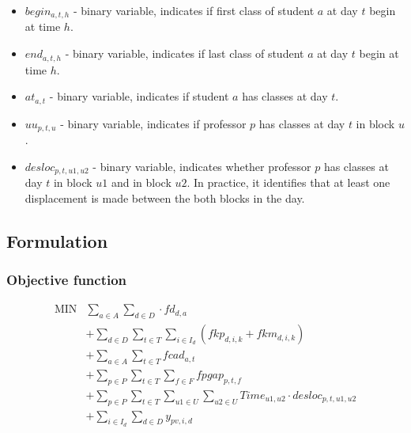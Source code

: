 \begin{itemize}
\item $begin_{a,t,h}$ - binary variable, indicates if first class of student $a$ at day $t$ begin at time $h$.
\item $end_{a,t,h}$ - binary variable, indicates if last class of student $a$ at day $t$ begin at time $h$.
\item $at_{a,t}$ - binary variable, indicates if student $a$ has classes at day $t$.
\item $uu_{p,t,u}$ - binary variable, indicates if professor $p$ has classes at day $t$ in block $u$.
\item $desloc_{p,t,u1,u2}$ - binary variable, indicates whether professor $p$ has classes at day $t$ in block $u1$ and in block $u2$. In practice, it identifies that at least one displacement is made between the both blocks in the day.

\end{itemize}



\subsection{Formulation}


\subsubsection{Objective function}
$$
\begin{array}{rl}
   \mbox{MIN} &
			\sum\limits_{a \in A}\sum\limits_{d \in D} \cdot fd_{d,a}
      \\
      &
       + \sum\limits_{d \in D} \sum\limits_{t \in T} \sum\limits_{i \in I_{d}} (fkp_{d,i,k} + fkm_{d,i,k})
      \\
      &
       + \sum\limits_{a \in A} \sum\limits_{t \in T} fcad_{a,t}
      \\
      &      
      + \sum\limits_{p \in P} \sum\limits_{t \in T} \sum\limits_{f \in F} fpgap_{p,t,f}
			\\
			&
			+ \sum\limits_{p \in P} \sum\limits_{t \in T} \sum\limits_{u1 \in U} \sum\limits_{u2 \in U} Time_{u1,u2} \cdot desloc_{p,t,u1,u2}
      \\
      &
      + \sum\limits_{i \in I_{d}} \sum\limits_{d \in D} y_{pv,i,d}
\end{array}
$$




